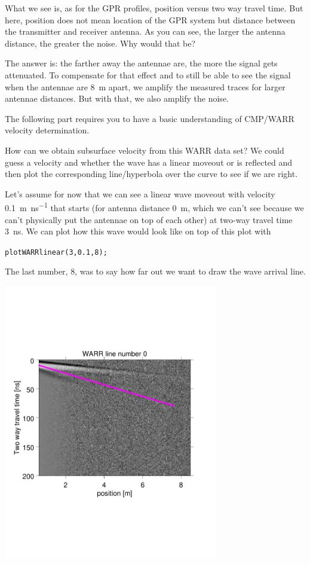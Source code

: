 \documentclass[11pt]{article}
\begin{document}
What we see is, as for the GPR profiles, position versus two way
travel time. But here, position does not mean location of the GPR
system but distance between the transmitter and receiver antenna. As
you can see, the larger the antenna distance, the greater the
noise. Why would that be?
 
The answer is: the farther away the antennae are, the more the signal
gets attenuated. To compensate for that effect and to still be able to
see the signal when the antennae are \SI{8}{m} apart, we amplify the
measured traces for larger antennae distances. But with that, we also
amplify the noise.
 
The following part requires you to have a basic understanding of
CMP/WARR velocity determination. 
 
How can we obtain subsurface velocity from this WARR data set? We
could guess a velocity and whether the wave has a linear moveout or
is reflected and then plot the corresponding line/hyperbola over the
curve to see if we are right.
 
Let's assume for now that we can see a linear wave moveout with velocity
\SI{0.1}{m\per\ns} that starts (for antenna distance \SI{0}{m}, which
we can't see because we can't physically put the antennae on top of
each other) at two-way travel time \SI{3}{\ns}. We can plot how this wave
would look like on top of this plot with
 
\qquad \verb#plotWARRlinear(3,0.1,8);#
  
The last number, 8, was to say how far out we want to draw the
   wave arrival line.
 
\begin{center}
\includegraphics[width=0.7\textwidth, trim = 0.9cm 6cm 2cm
  6.5cm,clip]{figures/WARRlinear}
\end{center}
\end{document}
